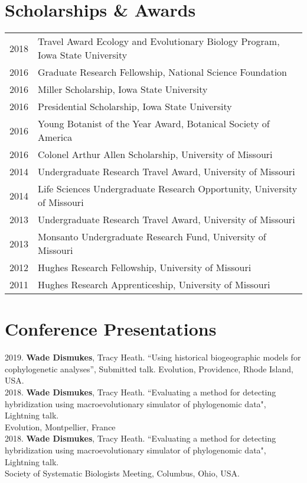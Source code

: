 \documentclass[12pt]{article}
\begin{document}
\section{Scholarships \& Awards}
\begin{tabular}{rl}
 2018 & Travel Award Ecology and Evolutionary Biology Program, Iowa State University\\
 2016 & Graduate Research Fellowship, National Science Foundation \\
 2016 & Miller Scholarship, Iowa State University \\ 
 2016 & Presidential Scholarship, Iowa State University \\
 2016 & Young Botanist of the Year Award, Botanical Society of America \\ 
 2016 & Colonel Arthur Allen Scholarship, University of Missouri \\
 2014 & Undergraduate Research Travel Award, University of Missouri \\
 2014 & Life Sciences Undergraduate Research Opportunity,  University of Missouri \\
 2013 & Undergraduate Research Travel Award, University of Missouri \\
 2013 & Monsanto Undergraduate Research Fund,  University of Missouri \\
 2012 & Hughes Research Fellowship,  University of Missouri \\
 2011 & Hughes Research Apprenticeship,  University of Missouri \\

\end{tabular}

\section{Conference Presentations}
2019. \textbf{Wade Dismukes}, Tracy Heath. ``Using historical biogeographic models for cophylogenetic analyses'', Submitted talk. 
Evolution, Providence, Rhode Island, USA.\\

2018. \textbf{Wade Dismukes}, Tracy Heath. ``Evaluating a method for detecting hybridization using macroevolutionary simulator of phylogenomic data", Lightning talk. \\
Evolution, Montpellier, France \\

2018. \textbf{Wade Dismukes}, Tracy Heath. ``Evaluating a method for detecting hybridization using macroevolutionary simulator of phylogenomic data", Lightning talk. \\
Society of Systematic Biologists Meeting, Columbus, Ohio, USA. \\
\end{document}
